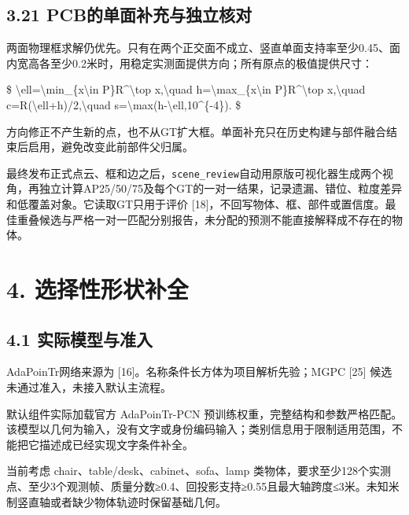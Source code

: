 \documentclass[UTF8,fontset=fandol]{ctexart}
\begin{document}
\subsection*{3.21 PCB的单面补充与独立核对}

两面物理框求解仍优先。只有在两个正交面不成立、竖直单面支持率至少0.45、面内宽高各至少0.2米时，用稳定实测面提供方向；所有原点的极值提供尺寸：



\$
\textbackslash{}ell=\textbackslash{}min\_\{x\textbackslash{}in P\}R\textasciicircum{}\textbackslash{}top x,\textbackslash{}quad h=\textbackslash{}max\_\{x\textbackslash{}in P\}R\textasciicircum{}\textbackslash{}top x,\textbackslash{}quad c=R(\textbackslash{}ell+h)/2,\textbackslash{}quad s=\textbackslash{}max(h-\textbackslash{}ell,10\textasciicircum{}\{-4\}).
\$



方向修正不产生新的点，也不从GT扩大框。单面补充只在历史构建与部件融合结束后启用，避免改变此前部件父归属。



最终发布正式点云、框和边之后，\texttt{scene\_\allowbreak{}review}自动用原版可视化器生成两个视角，再独立计算AP25/50/75及每个GT的一对一结果，记录遗漏、错位、粒度差异和低覆盖对象。它读取GT只用于评价 [18]，不回写物体、框、部件或置信度。最佳重叠候选与严格一对一匹配分别报告，未分配的预测不能直接解释成不存在的物体。



\section*{4. 选择性形状补全}

\subsection*{4.1 实际模型与准入}

AdaPoinTr网络来源为 [16]。名称条件长方体为项目解析先验；MGPC [25] 候选未通过准入，未接入默认主流程。



默认组件实际加载官方 AdaPoinTr-PCN 预训练权重，完整结构和参数严格匹配。该模型以几何为输入，没有文字或身份编码输入；类别信息用于限制适用范围，不能把它描述成已经实现文字条件补全。



当前考虑 chair、table/desk、cabinet、sofa、lamp 类物体，要求至少128个实测点、至少3个观测帧、质量分数≥0.4、回投影支持≥0.55且最大轴跨度≤3米。未知米制竖直轴或者缺少物体轨迹时保留基础几何。
\end{document}
